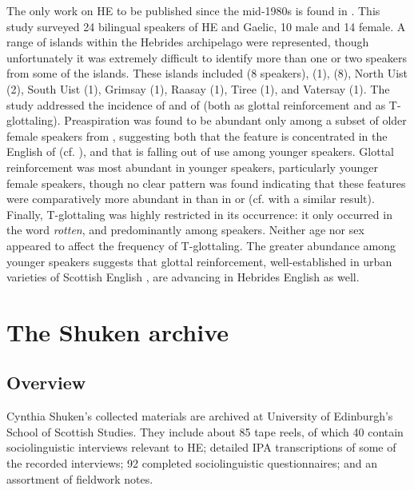 \documentclass[output=paper,colorlinks,citecolor=brown]{langscibook}
\begin{document}
The only work on HE to be published since the mid-1980s is found in \citet{Clayton:2015, Clayton:2017, Clayton:2018}. This study surveyed 24 bilingual speakers of HE and Gaelic, 10 male and 14 female. A range of islands within the Hebrides archipelago were represented, though unfortunately it was extremely difficult to identify more than one or two speakers from some of the islands. These islands included  (8 speakers),  (1),  (8), North Uist (2), South Uist (1), Grimsay (1), Raasay (1), Tiree (1), and Vatersay (1). The study addressed the incidence of  and of  (both as glottal reinforcement and as T-glottaling). Preaspiration was found to be abundant only among a subset of older female speakers from , suggesting both that the feature is concentrated in the English of  (cf. \citealt{Borgstrom:1940, Shuken:1984, Sabban:1985}), and that  is falling out of use among younger speakers. Glottal reinforcement was most abundant in younger speakers, particularly younger female speakers, though no clear pattern was found indicating that these features were comparatively more abundant in  than in  or  (cf. \citealt{Shuken:1985} with a similar result). Finally, T-glottaling was highly restricted in its occurrence: it only occurred in the word \textit{rotten}, and predominantly among  speakers. Neither age nor sex appeared to affect the frequency of T-glottaling. The greater abundance among younger speakers suggests that glottal reinforcement, well-established in urban varieties of Scottish English \citep{Stuart-Smith:2008, Stuart-Smith:2003, Stuart-Smith:1999a, Stuart-Smith:1999b, Wells:1982}, are advancing in Hebrides English as well.

\section{The Shuken archive}\label{theshukenarchive}

\subsection{Overview}

Cynthia Shuken’s collected materials are archived at University of Edinburgh’s School of Scottish Studies. They include about 85 tape reels, of which 40 contain sociolinguistic interviews relevant to HE; detailed IPA transcriptions of some of the recorded interviews; 92 completed sociolinguistic questionnaires; and an assortment of fieldwork notes. 
\end{document}
